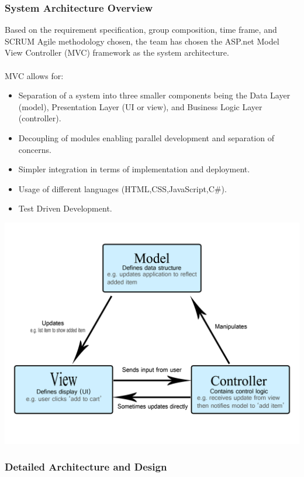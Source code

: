 \documentclass[paper=a4, fontsize=11pt]{scrartcl}
\numberwithin{equation}{section}		%
\numberwithin{figure}{section}			%
\numberwithin{table}{section}				%
\begin{document}
\subsubsection{System Architecture Overview}
Based on the requirement specification, group composition, time frame, and SCRUM Agile methodology chosen, the team has chosen the ASP.net Model View Controller (MVC) framework as the system architecture. \\\\MVC allows for:
\begin{itemize}
\item Separation of a system into three smaller components being the Data Layer (model), Presentation Layer (UI or view), and Business Logic Layer (controller).
\item Decoupling of modules enabling parallel development and separation of concerns.
\item Simpler integration in terms of implementation and deployment.
\item Usage of different languages (HTML,CSS,JavaScript,C\#).
\item Test Driven Development.
\end{itemize}

\includegraphics[width = \textwidth]{MVC.png}


\subsubsection{Detailed Architecture and Design}
\end{document}
